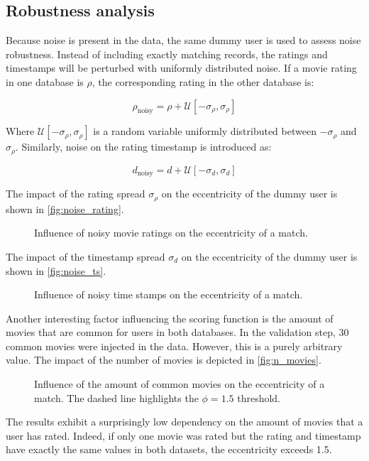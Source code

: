 \subsection{Robustness analysis}

Because noise is present in the data, the same dummy user is used to assess noise robustness. Instead of including exactly matching records, the ratings and timestamps will be perturbed with uniformly distributed noise. If a movie rating in one database is $\rho$, the corresponding rating in the other database is:

\begin{equation}
	\rho_{\text{noisy}} = \rho + \mathcal{U}\left[-\sigma_{\rho}, \sigma_{\rho}\right]
\end{equation}

Where $\mathcal{U}\left[-\sigma_{\rho}, \sigma_{\rho}\right]$ is a random variable uniformly distributed between $-\sigma_{\rho}$ and $\sigma_{\rho}$. Similarly, noise on the rating timestamp is introduced as:

\begin{equation}
d_{\text{noisy}} = d + \mathcal{U}\left[-\sigma_{d}, \sigma_{d}\right]
\end{equation}

The impact of the rating spread $\sigma_{\rho}$ on the eccentricity of the dummy user is shown in \autoref{fig:noise_rating}.

\begin{figure}[h]
	\centering
	
	\caption{Influence of noisy movie ratings on the eccentricity of a match.}
	\label{fig:noise_rating}
\end{figure}

The impact of the timestamp spread $\sigma_{d}$ on the eccentricity of the dummy user is shown in \autoref{fig:noise_ts}.

\begin{figure}[h]
	\centering
	
	\caption{Influence of noisy time stamps on the eccentricity of a match.}
	\label{fig:noise_ts}
\end{figure}

Another interesting factor influencing the scoring function is the amount of movies that are common for users in both databases. In the validation step, 30 common movies were injected in the data. However, this is a purely arbitrary value. The impact of the number of movies is depicted in \autoref{fig:n_movies}.

\begin{figure}[h]
	\centering
	
	\caption{Influence of the amount of common movies on the eccentricity of a match. The dashed line highlights the $\phi = 1.5$ threshold.}
	\label{fig:n_movies}
\end{figure}

The results exhibit a surprisingly low dependency on the amount of movies that a user has rated. Indeed, if only one movie was rated but the rating and timestamp have exactly the same values in both datasets, the eccentricity exceeds 1.5.